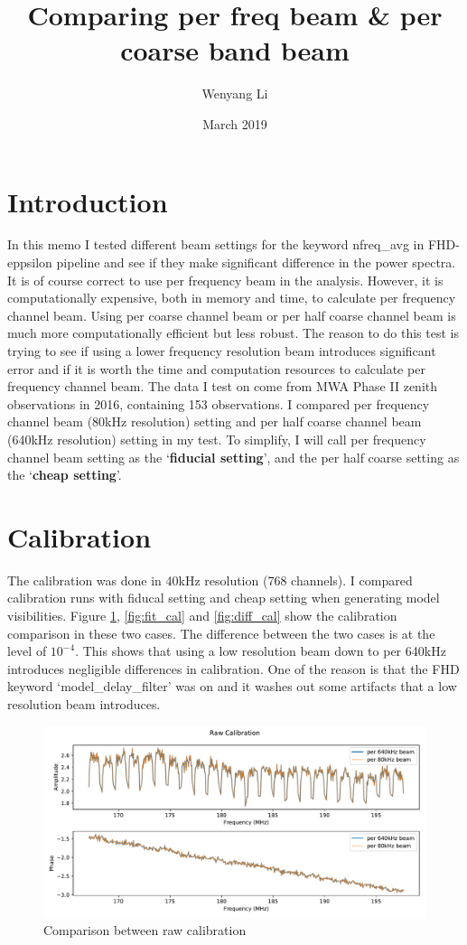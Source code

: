 \documentclass[10pt]{extarticle}
\title{Comparing per freq beam \& per coarse band beam}
\author{Wenyang Li}
\date{March 2019}
\begin{document}
\maketitle

\section{Introduction}
In this memo I tested different beam settings for the keyword nfreq\_avg in FHD-eppsilon pipeline and see if they make significant difference in the power spectra. It is of course correct to use per frequency beam in the analysis. However, it is computationally expensive, both in memory and time, to calculate per frequency channel beam. Using per coarse channel beam or per half coarse channel beam is much more computationally efficient but less robust. The reason to do this test is trying to see if using a lower frequency resolution beam introduces significant error and if it is worth the time and computation resources to calculate per frequency channel beam. The data I test on come from MWA Phase II zenith observations in 2016, containing 153 observations. I compared per frequency channel beam (80kHz resolution) setting and per half coarse channel beam (640kHz resolution) setting in my test. To simplify, I will call per frequency channel beam setting as the `\textbf{fiducial setting}', and the per half coarse setting as the `\textbf{cheap setting}'.

\section{Calibration}
The calibration was done in 40kHz resolution (768 channels). I compared calibration runs with fiducal setting and cheap setting when generating model visibilities. Figure \ref{fig:raw_cal}, \ref{fig:fit_cal} and \ref{fig:diff_cal} show the calibration comparison in these two cases. The difference between the two cases is at the level of $10^{-4}$. This shows that using a low resolution beam down to per 640kHz introduces negligible differences in calibration. One of the reason is that the FHD keyword `model\_delay\_filter' was on and it washes out some artifacts that a low resolution beam introduces.


\begin{figure}
    \centering
    \includegraphics[width=0.8\linewidth]{raw_cal.pdf}
    \caption{Comparison between raw calibration}
    \label{fig:raw_cal}
\end{figure}
\end{document}
